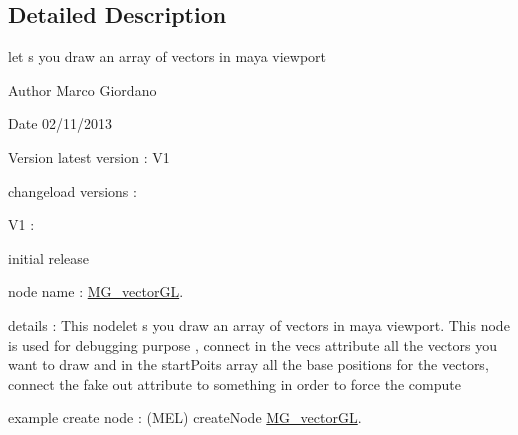 \subsection{Detailed Description}
let s you draw an array of vectors in maya viewport 

\begin{DoxyAuthor}{Author}
Marco Giordano 
\end{DoxyAuthor}
\begin{DoxyDate}{Date}
02/11/2013 
\end{DoxyDate}
\begin{DoxyVersion}{Version}
latest version \-: V1 

changeload versions \-: \par
 V1 \-: \par

\begin{DoxyItemize}
\item initial release \par

\end{DoxyItemize}
\end{DoxyVersion}
node name \-: \hyperlink{class_m_g__vector_g_l}{M\-G\-\_\-vector\-G\-L}.

details \-: This nodelet s you draw an array of vectors in maya viewport. This node is used for debugging purpose , connect in the vecs attribute all the vectors you want to draw and in the start\-Poits array all the base positions for the vectors, connect the fake out attribute to something in order to force the compute

example create node \-: (M\-E\-L) create\-Node \hyperlink{class_m_g__vector_g_l}{M\-G\-\_\-vector\-G\-L}. 

